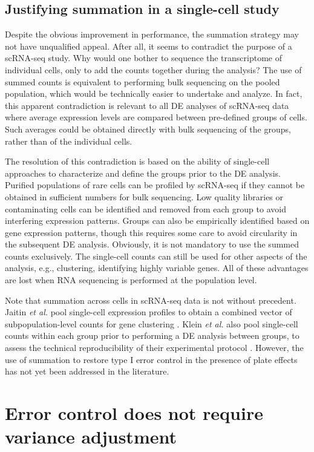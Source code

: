 \documentclass{article}
\begin{document}
\subsection{Justifying summation in a single-cell study}
Despite the obvious improvement in performance, the summation strategy may not have unqualified appeal.
After all, it seems to contradict the purpose of a scRNA-seq study. 
Why would one bother to sequence the transcriptome of individual cells, only to add the counts together during the analysis?
The use of summed counts is equivalent to performing bulk sequencing on the pooled population, which would be technically easier to undertake and analyze.
In fact, this apparent contradiction is relevant to all DE analyses of scRNA-seq data where average expression levels are compared between pre-defined groups of cells.
Such averages could be obtained directly with bulk sequencing of the groups, rather than of the individual cells.

The resolution of this contradiction is based on the ability of single-cell approaches to characterize and define the groups prior to the DE analysis.
Purified populations of rare cells can be profiled by scRNA-seq if they cannot be obtained in sufficient numbers for bulk sequencing.
Low quality libraries or contaminating cells can be identified and removed from each group to avoid interfering expression patterns.
Groups can also be empirically identified based on gene expression patterns, though this requires some care to avoid circularity in the subsequent DE analysis.
Obviously, it is not mandatory to use the summed counts exclusively. 
The single-cell counts can still be used for other aspects of the analysis, e.g., clustering, identifying highly variable genes.
All of these advantages are lost when RNA sequencing is performed at the population level.

Note that summation across cells in scRNA-seq data is not without precedent.
Jaitin \textit{et al.} pool single-cell expression profiles to obtain a combined vector of subpopulation-level counts for gene clustering \cite{jaitin2014massively}.
Klein \textit{et al.} also pool single-cell counts within each group prior to performing a DE analysis between groups,
    to assess the technical reproducibility of their experimental protocol \cite{klein2015droplet}.
However, the use of summation to restore type I error control in the presence of plate effects has not yet been addressed in the literature.

\section{Error control does not require variance adjustment}
\end{document}
